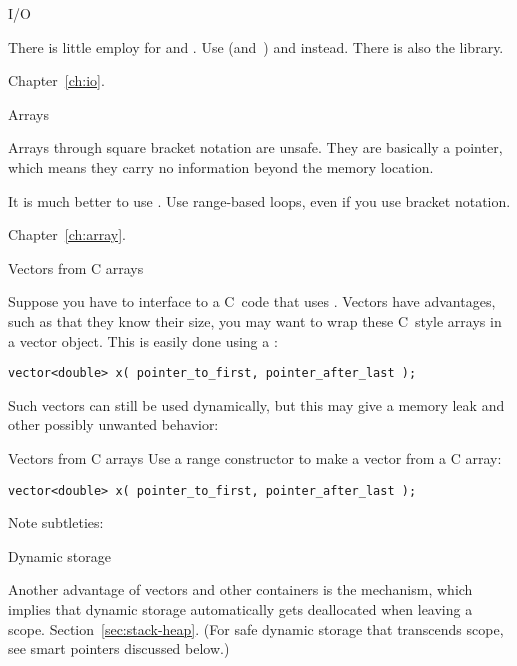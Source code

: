 
 {I/O}

There is little employ for  and
. Use  (and~)
and  instead. There is also the  library.

Chapter~\ref{ch:io}.

 {Arrays}

Arrays through square bracket notation are unsafe. They are basically
a pointer, which means they carry no information beyond the memory location.

It is much better
to use . Use range-based loops, even if you use
bracket notation.

Chapter~\ref{ch:array}.

 {Vectors from C arrays}

Suppose you have to interface to a C~code that uses
.  Vectors have advantages, such as that they know
their size, you may want to wrap these C~style arrays in a vector
object. This is easily done using a :
\begin{lstlisting}
vector<double> x( pointer_to_first, pointer_after_last );
\end{lstlisting}

Such vectors can still be used dynamically, but this may give a memory
leak and other possibly unwanted behavior:


\begin{slide}{Vectors from C arrays}
  \label{sl:cvector}
  Use a range constructor to make a vector from a C array:
\begin{lstlisting}
vector<double> x( pointer_to_first, pointer_after_last );
\end{lstlisting}
Note subtleties:
%
\end{slide}

 {Dynamic storage}

Another advantage of vectors and other containers is the 
mechanism, which implies that dynamic storage automatically gets
deallocated when leaving a scope. Section~\ref{sec:stack-heap}. (For
safe dynamic storage that transcends scope, see smart pointers
discussed below.)

